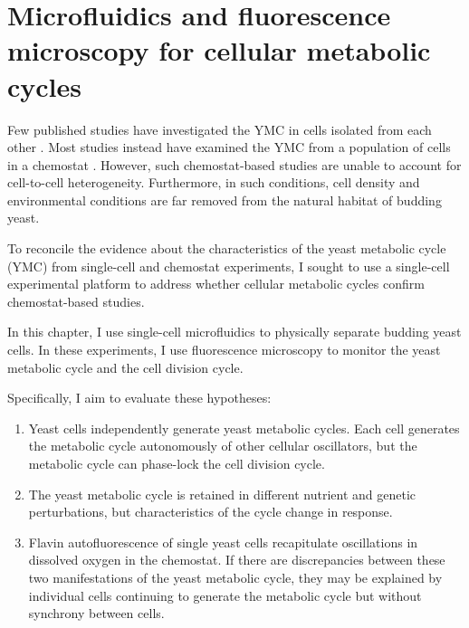 \chapter{Microfluidics and fluorescence microscopy for cellular metabolic cycles}
\label{ch:biology}

Few published studies have investigated the YMC in cells isolated from each other \parencite{silvermanMetabolicCyclingSingle2010,papagiannakisAutonomousMetabolicOscillations2017,baumgartnerFlavinbasedMetabolicCycles2018,ozsezenInferenceHighLevelInteraction2019}.
Most studies instead have examined the YMC from a population of cells in a chemostat \parencite{tuLogicYeastMetabolic2005,tuCyclicChangesMetabolic2007,murrayRedoxRegulationRespiring2011,caustonMetabolicCyclesYeast2015,mellorMolecularBasisMetabolic2016,oneillEukaryoticCellBiology2020,amponsahPeroxiredoxinsCoupleMetabolism2021}.
However, such chemostat-based studies are unable to account for cell-to-cell heterogeneity.
Furthermore, in such conditions, cell density and environmental conditions are far removed from the natural habitat of budding yeast.

To reconcile the evidence about the characteristics of the yeast metabolic cycle (YMC) from single-cell and chemostat experiments, I sought to use a single-cell experimental platform to address whether cellular metabolic cycles confirm chemostat-based studies.

In this chapter, I use single-cell microfluidics to physically separate budding yeast cells.
In these experiments, I use fluorescence microscopy to monitor the yeast metabolic cycle and the cell division cycle.

\pagebreak

Specifically, I aim to evaluate these hypotheses:
\begin{enumerate}
  \item Yeast cells independently generate yeast metabolic cycles.
        Each cell generates the metabolic cycle autonomously of other cellular oscillators, but the metabolic cycle can phase-lock the cell division cycle.
  \item The yeast metabolic cycle is retained in different nutrient and genetic perturbations, but characteristics of the cycle change in response.
  \item Flavin autofluorescence of single yeast cells recapitulate oscillations in dissolved oxygen in the chemostat.
        If there are discrepancies between these two manifestations of the yeast metabolic cycle, they may be explained by individual cells continuing to generate the metabolic cycle but without synchrony between cells.
\end{enumerate}

